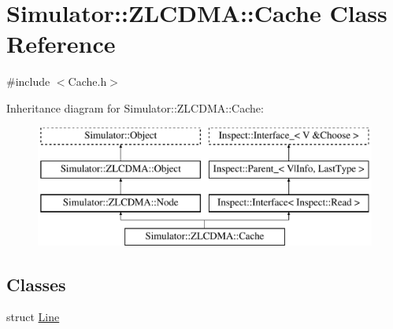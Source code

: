 \hypertarget{class_simulator_1_1_z_l_c_d_m_a_1_1_cache}{\section{Simulator\+:\+:Z\+L\+C\+D\+M\+A\+:\+:Cache Class Reference}
\label{class_simulator_1_1_z_l_c_d_m_a_1_1_cache}
}


{\ttfamily \#include $<$Cache.\+h$>$}

Inheritance diagram for Simulator\+:\+:Z\+L\+C\+D\+M\+A\+:\+:Cache\+:\begin{figure}[H]
\begin{center}
\leavevmode
\includegraphics[height=4.000000cm]{class_simulator_1_1_z_l_c_d_m_a_1_1_cache}
\end{center}
\end{figure}
\subsection*{Classes}
\begin{DoxyCompactItemize}
\item 
struct \hyperlink{struct_simulator_1_1_z_l_c_d_m_a_1_1_cache_1_1_line}{Line}
\end{DoxyCompactItemize}
